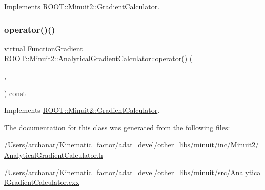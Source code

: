 Implements \mbox{\hyperlink{classROOT_1_1Minuit2_1_1GradientCalculator_a1809c1e8a89d32aabf7835e9690c2916}{R\+O\+O\+T\+::\+Minuit2\+::\+Gradient\+Calculator}}.

\mbox{\label{classROOT_1_1Minuit2_1_1AnalyticalGradientCalculator_a4048ce1c6e9b120f5cb808f090a90030}} 
\subsubsection{\texorpdfstring{operator()()}{operator()()}\hspace{0.1cm}{\footnotesize\ttfamily [4/4]}}
{\footnotesize\ttfamily virtual \mbox{\hyperlink{classROOT_1_1Minuit2_1_1FunctionGradient}{Function\+Gradient}} R\+O\+O\+T\+::\+Minuit2\+::\+Analytical\+Gradient\+Calculator\+::operator() (\begin{DoxyParamCaption}\item[{const \mbox{\hyperlink{classROOT_1_1Minuit2_1_1MinimumParameters}{Minimum\+Parameters}} \&}]{,  }\item[{const \mbox{\hyperlink{classROOT_1_1Minuit2_1_1FunctionGradient}{Function\+Gradient}} \&}]{ }\end{DoxyParamCaption}) const\hspace{0.3cm}{\ttfamily [virtual]}}



Implements \mbox{\hyperlink{classROOT_1_1Minuit2_1_1GradientCalculator_a1809c1e8a89d32aabf7835e9690c2916}{R\+O\+O\+T\+::\+Minuit2\+::\+Gradient\+Calculator}}.



The documentation for this class was generated from the following files\+:\begin{DoxyCompactItemize}
\item 
/\+Users/archanar/\+Kinematic\+\_\+factor/adat\+\_\+devel/other\+\_\+libs/minuit/inc/\+Minuit2/\mbox{\hyperlink{other__libs_2minuit_2inc_2Minuit2_2AnalyticalGradientCalculator_8h}{Analytical\+Gradient\+Calculator.\+h}}\item 
/\+Users/archanar/\+Kinematic\+\_\+factor/adat\+\_\+devel/other\+\_\+libs/minuit/src/\mbox{\hyperlink{AnalyticalGradientCalculator_8cxx}{Analytical\+Gradient\+Calculator.\+cxx}}\end{DoxyCompactItemize}
